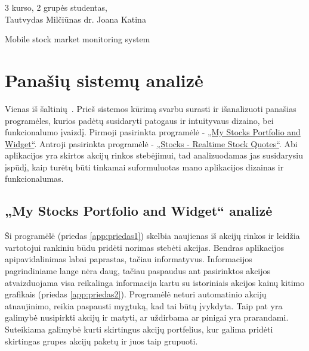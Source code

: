 \documentclass[a4paper,12pt,fleqn]{article}
\begin{document}
{3 kurso, 2 grupės studentas, \\ Tautvydas Milčiūnas} 
 {}{}{}{}%
 {dr. Joana Katina}

\tableofcontents



\bothabstracts{}%
{Mobile stock market monitoring system} %
{}%





\newpage
\section{Panašių sistemų analizė}
Vienas iš šaltinių~\cite{KTZ}. Prieš sistemos kūrimą svarbu surasti ir išanalizuoti panašias programėles, kurios padėtų susidaryti patogaus ir intuityvaus dizaino, bei funkcionalumo įvaizdį. Pirmoji pasirinkta programėlė -
\href{https://play.google.com/store/apps/details?id=co.peeksoft.stocks}{„My Stocks Portfolio and Widget“}.  Antroji pasirinkta programėlė - \href{https://play.google.com/store/apps/details?id=org.dayup.stocks}{„Stocks - Realtime Stock Quotes“}. Abi aplikacijos yra skirtos akcijų rinkos stebėjimui, tad analizuodamas jas susidarysiu įspūdį, kaip turėtų būti tinkamai suformuluotas mano aplikacijos dizainas ir funkcionalumas.
\subsection{„My Stocks Portfolio and Widget“ analizė}
Ši programėlė (priedas \ref{app:priedas1}) skelbia naujienas iš akcijų rinkos ir leidžia vartotojui rankiniu būdu pridėti norimas stebėti akcijas. Bendras aplikacijos apipavidalinimas labai paprastas, tačiau informatyvus. Informacijos pagrindiniame lange nėra daug, tačiau paspaudus ant pasirinktos akcijos atvaizduojama visa reikalinga informacija kartu su istoriniais akcijos kainų kitimo grafikais (priedas \ref{app:priedas2}). Programėlė neturi automatinio akcijų atnaujinimo, reikia paspausti mygtuką, kad tai būtų įvykdyta. Taip pat yra galimybė nusipirkti akcijų ir matyti, ar uždirbama ar pinigai yra prarandami. Suteikiama galimybė kurti skirtingus akcijų portfelius, kur galima pridėti skirtingas grupes akcijų paketų ir juos taip grupuoti.
\end{document}
